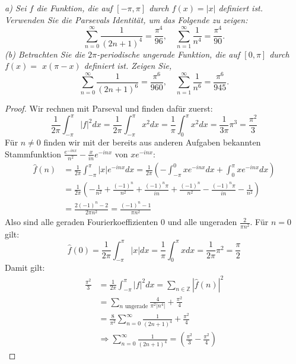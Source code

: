 \documentclass[11pt]{article}
\newcommand{\Z}{\mathbb{Z}}
\newenvironment{problem}[2][Beispiel]{
    \begin{trivlist}
        \item[\hskip \labelsep {\bfseries #1}\hskip \labelsep {\bfseries #2.}] \itshape}{
    \end{trivlist}\normalshape
}
\begin{document}
    \begin{problem}{2}
    (a) Sei $f$ die Funktion, die auf $[-\pi, \pi]$ durch $f(x)=|x|$ definiert ist. Verwenden Sie
    die Parsevals Identität, um das Folgende zu zeigen:
    $$
    \sum_{n=0}^{\infty} \frac{1}{(2 n+1)^4}=\frac{\pi^4}{96}, \quad \sum_{n=1}^{\infty} \frac{1}{n^4}
    =\frac{\pi^4}{90} .
    $$
    (b) Betrachten Sie die $2 \pi$-periodische ungerade Funktion, die auf $[0, \pi]$ durch
    $f(x)=$ $x(\pi-x)$ definiert ist. Zeigen Sie,
    $$
    \sum_{n=0}^{\infty} \frac{1}{(2 n+1)^6}=\frac{\pi^6}{960}, \quad \sum_{n=1}^{\infty} \frac{1}{n^6}
    =\frac{\pi^6}{945} .
    $$
    \end{problem}

    \begin{proof}
        Wir rechnen mit Parseval und finden dafür zuerst:
        $$\frac{1}{2\pi}\int_{-\pi}^{\pi} |f|^2dx=\frac{1}{2\pi}\int_{-\pi}^{\pi} x^2dx
        =\frac{1}{\pi}\int_{0}^{\pi} x^2dx=\frac{1}{3\pi}\pi^3=\frac{\pi^2}{3}$$
        Für $n\neq 0$ finden wir mit der bereits aus anderen Aufgaben bekannten Stammfunktion
        $\frac{e^{-inx}}{n^2}-\frac{x}{in}e^{-inx}$ von $xe^{-inx}$:
        $$\begin{aligned}
              \hat{f}(n) &= \frac{1}{2\pi}\int_{-\pi}^{\pi} |x|e^{-inx}dx =
              \frac{1}{2\pi}\left(-\int_{-\pi}^{0} xe^{-inx}dx+\int_{0}^{\pi} xe^{-inx}dx\right)\\
              &= \frac{1}{2\pi}\left(-\frac{1}{n^2}+\frac{(-1)^n}{n^2}+\frac{(-1)^n\pi}{in}+
              \frac{(-1)^n}{n^2}-\frac{(-1)^n\pi}{in}-\frac{1}{n^2}\right)\\
              &= \frac{2(-1)^n-2}{2\pi n^2}=\frac{(-1)^n-1}{\pi n^2}
        \end{aligned}$$
        Also sind alle geraden Fourierkoeffizienten $0$ und alle ungeraden $\frac{2}{\pi n^2}$. Für $n=0$
        gilt:
        $$\hat{f}(0)= \frac{1}{2\pi}\int_{-\pi}^{\pi} |x|dx=\frac{1}{\pi}\int_0^\pi xdx=\frac{1}{2\pi}\pi^2
        =\frac{\pi}{2}$$
        Damit gilt:
        $$\begin{aligned}
              \frac{\pi^2}{3}&=\frac{1}{2\pi}\int_{-\pi}^{\pi} |f|^2dx=\sum_{n\in \Z}|\hat{f}(n)|^2\\
              &=\sum_{n\text{ ungerade}}\frac{4}{\pi^2|n^4|} + \frac{\pi^2}{4}\\
              &= \frac{8}{\pi^2}\sum_{n=0}^{\infty }\frac{1}{(2n+1)^4}+ \frac{\pi^2}{4}\\
              &\Rightarrow \sum_{n=0}^{\infty }\frac{1}{(2n+1)^4}=\left(\frac{\pi^2}{3}-\frac{\pi^2}{4}\right)

\end{aligned}$$
\end{proof}
\end{document}
